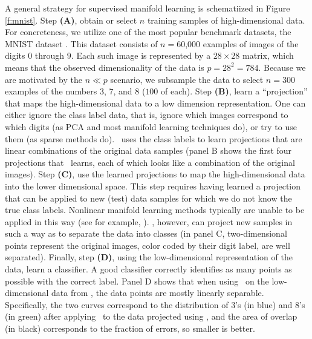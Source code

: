 \documentclass[10pt]{article}
\begin{document}
A general strategy for supervised manifold learning is schematiized in Figure \ref{f:mnist}.
Step \textbf{(A)},  obtain or select $n$ training samples of high-dimensional data.  For concreteness, we utilize one of the most popular benchmark datasets, the MNIST dataset \cite{mnist}.  This dataset consists of $n=60$,$000$ examples of images of the digits $0$ through $9$.  Each such image is represented by a $28\times28$ matrix, which means that the observed  dimensionality of the data is $p=28^2=784$.  Because we are motivated by the $n \ll p$ scenario, we subsample the data to select $n=300$ examples of the numbers $3$, $7$, and $8$ ($100$ of each).
%
Step \textbf{(B)},  learn a ``projection'' that maps the high-dimensional data to a low dimension representation.  One can either ignore the class label data, that is, ignore which images correspond to which digits (as PCA and most manifold learning techniques do), or try to use them (as sparse methods do).  \Lol~uses the class labels to learn projections that are linear combinations of the original data samples (panel B shows the first four projections that \Lol~learns, each of which looks like a combination of the original images).  
%
Step \textbf{(C)}, use the learned projections to map the high-dimensional data into the lower dimensional space. This step requires having learned a projection that can be applied to new (test) data samples for which we do not know the true class labels.  Nonlinear manifold learning methods typically are unable to be applied in this way (see for example, \citet{oos}).  \Lol, however, can project new samples in such a way as to separate the data into classes (in panel C, two-dimensional points represent the original images, color coded by their digit label, are well separated).
Finally, step \textbf{(D)}, using the low-dimensional representation of the data, learn a classifier.  A good classifier correctly identifies as many points as possible with the correct label.  Panel D shows that when using \Lda~on the low-dimensional data from \Lol, the data points are mostly linearly separable.  
Specifically, the two curves correspond to the distribution of $3$'s (in blue) and $8$'s (in green) after applying \Lda~to the data projected using \Lol, and the area of overlap (in black) corresponds to the fraction of errors, so smaller is better. 



\end{document}
